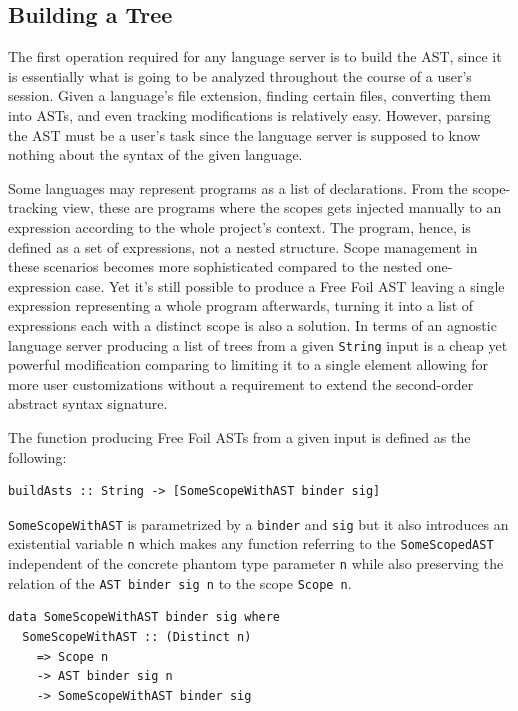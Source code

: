 \subsection{Building a Tree}

The first operation required for any language server is to build the AST, since it is essentially what is going to be analyzed throughout the course of a user's session. 
Given a language's file extension, finding certain files, converting them into ASTs, and even tracking modifications is relatively easy.
However, parsing the AST must be a user's task since the language server is supposed to know nothing about the syntax of the given language.

Some languages may represent programs as a list of declarations.
From the scope-tracking view, these are programs where the scopes gets injected manually to an expression according to the whole project's context.
The program, hence, is defined as a set of expressions, not a nested structure. 
Scope management in these scenarios becomes more sophisticated compared to the nested one-expression case.
Yet it's still possible to produce a Free Foil AST leaving a single expression representing a whole program afterwards, turning it into a list of expressions each with a distinct scope is also a solution.
In terms of an agnostic language server producing a list of trees from a given \texttt{String} input is a cheap yet powerful modification comparing to limiting it to a single element allowing for more user customizations without a requirement to extend the second-order abstract syntax signature. 

The function producing Free Foil ASTs from a given input is defined as the following:

\begin{verbatim}
buildAsts :: String -> [SomeScopeWithAST binder sig]
\end{verbatim}

\texttt{SomeScopeWithAST} is parametrized by a \texttt{binder} and \texttt{sig} but it also introduces an existential variable \texttt{n} which makes any function referring to the \texttt{SomeScopedAST} independent of the concrete phantom type parameter \texttt{n} while also preserving the relation of the \texttt{AST binder sig n} to the scope \texttt{Scope n}.

\begin{verbatim}
data SomeScopeWithAST binder sig where
  SomeScopeWithAST :: (Distinct n) 
    => Scope n 
    -> AST binder sig n 
    -> SomeScopeWithAST binder sig
\end{verbatim}

